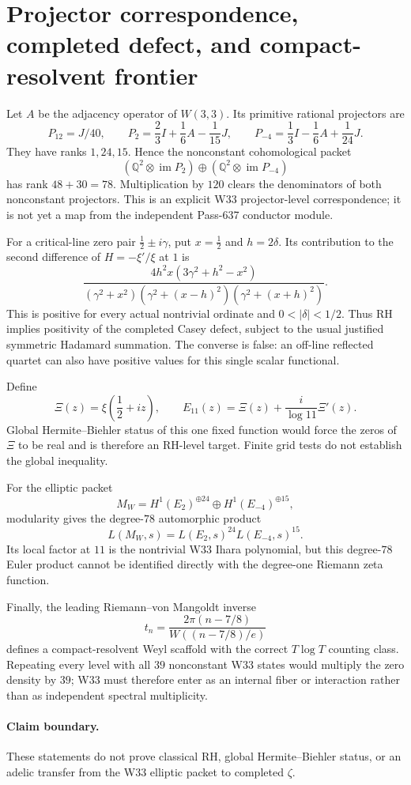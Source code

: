 
\section{Projector correspondence, completed defect, and compact-resolvent frontier}

Let $A$ be the adjacency operator of $W(3,3)$. Its primitive rational
projectors are
\[
P_{12}=J/40,\qquad
P_2=\frac23I+\frac16A-\frac1{15}J,\qquad
P_{-4}=\frac13I-\frac16A+\frac1{24}J.
\]
They have ranks $1,24,15$. Hence the nonconstant cohomological packet
\[
(\mathbb Q^2\otimes\operatorname{im}P_2)
\oplus
(\mathbb Q^2\otimes\operatorname{im}P_{-4})
\]
has rank $48+30=78$. Multiplication by $120$ clears the denominators of both
nonconstant projectors. This is an explicit W33 projector-level
correspondence; it is not yet a map from the independent Pass-637 conductor
module.

For a critical-line zero pair $\frac12\pm i\gamma$, put
$x=\frac12$ and $h=2\delta$. Its contribution to the second difference of
$H=-\xi'/\xi$ at $1$ is
\[
\frac{4h^2x(3\gamma^2+h^2-x^2)}
{(\gamma^2+x^2)(\gamma^2+(x-h)^2)(\gamma^2+(x+h)^2)}.
\]
This is positive for every actual nontrivial ordinate and
$0<|\delta|<1/2$. Thus RH implies positivity of the completed Casey defect,
subject to the usual justified symmetric Hadamard summation. The converse is
false: an off-line reflected quartet can also have positive values for this
single scalar functional.

Define
\[
\Xi(z)=\xi\!\left(\frac12+iz\right),\qquad
E_{11}(z)=\Xi(z)+\frac{i}{\log 11}\Xi'(z).
\]
Global Hermite--Biehler status of this one fixed function would force the zeros
of $\Xi$ to be real and is therefore an RH-level target. Finite grid tests do
not establish the global inequality.

For the elliptic packet
\[
M_W=H^1(E_2)^{\oplus24}\oplus H^1(E_{-4})^{\oplus15},
\]
modularity gives the degree-$78$ automorphic product
\[
L(M_W,s)=L(E_2,s)^{24}L(E_{-4},s)^{15}.
\]
Its local factor at $11$ is the nontrivial W33 Ihara polynomial, but this
degree-$78$ Euler product cannot be identified directly with the degree-one
Riemann zeta function.

Finally, the leading Riemann--von Mangoldt inverse
\[
t_n=\frac{2\pi(n-7/8)}{W((n-7/8)/e)}
\]
defines a compact-resolvent Weyl scaffold with the correct $T\log T$ counting
class. Repeating every level with all $39$ nonconstant W33 states would
multiply the zero density by $39$; W33 must therefore enter as an internal
fiber or interaction rather than as independent spectral multiplicity.

\paragraph{Claim boundary.}
These statements do not prove classical RH, global Hermite--Biehler status,
or an adelic transfer from the W33 elliptic packet to completed $\zeta$.
